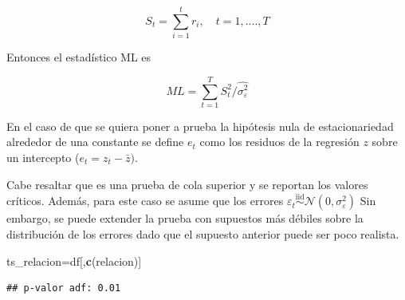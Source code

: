 \documentclass[
  oneside]{article}
\newenvironment{Shaded}{\begin{snugshade}}{\end{snugshade}}
\newcommand{\FunctionTok}[1]{\textcolor[rgb]{0.13,0.29,0.53}{\textbf{#1}}}
\newcommand{\NormalTok}[1]{#1}
\newcommand{\OtherTok}[1]{\textcolor[rgb]{0.56,0.35,0.01}{#1}}
\newcommand{\SpecialCharTok}[1]{\textcolor[rgb]{0.81,0.36,0.00}{\textbf{#1}}}
\newcommand{\StringTok}[1]{\textcolor[rgb]{0.31,0.60,0.02}{#1}}
\begin{document}
\begin{equation}
    \label{eq: kpss5}
    S_t=\sum_{i=1}^t r_i, \quad t=1,....,T   
\end{equation}

Entonces el estadístico ML es

\begin{equation}
    \label{eq: kpss6}
    ML=\sum_{t=1}^T S^2_t/\hat{\sigma^2_\varepsilon}   
\end{equation}

En el caso de que se quiera poner a prueba la hipótesis nula de
estacionariedad alrededor de una constante se define \(e_t\) como los
residuos de la regresión \(z\) sobre un intercepto
(\(e_t=z_t-\bar{z})\).

Cabe resaltar que es una prueba de cola superior y se reportan los
valores críticos. Además, para este caso se asume que los errores
\(\varepsilon_t \overset{\text{iid}}{\sim} \mathcal{N}(0,\sigma_{\varepsilon}^2)\)
Sin embargo, se puede extender la prueba con supuestos más débiles sobre
la distribución de los errores dado que el supuesto anterior puede ser
poco realista.

\begin{Shaded}
\begin{Highlighting}[]
\NormalTok{ts\_relacion}\OtherTok{=}\NormalTok{df[,}\FunctionTok{c}\NormalTok{(}\StringTok{\textquotesingle{}relacion\textquotesingle{}}\NormalTok{)]}
\end{Highlighting}
\end{Shaded}

\begin{Shaded}
\end{Shaded}

\begin{verbatim}
## p-valor adf: 0.01
\end{verbatim}

\begin{Shaded}
\end{Shaded}
\end{document}
